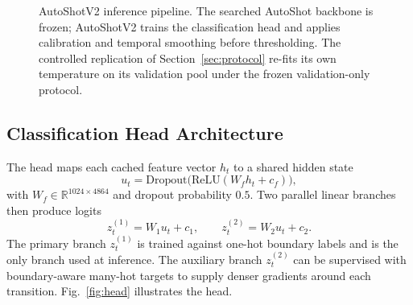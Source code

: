 \begin{figure}[!t]
\centering
{}
\caption{AutoShotV2 inference pipeline. The searched AutoShot backbone is
frozen; AutoShotV2 trains the classification head and applies calibration
and temporal smoothing before thresholding. The controlled replication of
Section~\ref{sec:protocol} re-fits its own temperature on its validation
pool under the frozen validation-only protocol.}
\label{fig:pipeline}
\end{figure}

\subsection{Classification Head Architecture}
\label{sec:head}

The head maps each cached feature vector $h_t$ to a shared hidden state
\begin{equation}
    u_t = \mathrm{Dropout}\bigl(\mathrm{ReLU}(W_f h_t + c_f)\bigr),
    \label{eq:hidden}
\end{equation}
with $W_f\in\mathbb{R}^{1024\times4864}$ and dropout probability $0.5$. Two
parallel linear branches then produce logits
\begin{equation}
    z^{(1)}_t = W_1 u_t + c_1, \qquad z^{(2)}_t = W_2 u_t + c_2.
    \label{eq:branches}
\end{equation}
The primary branch $z^{(1)}_t$ is trained against one-hot boundary labels
and is the only branch used at inference. The auxiliary branch
$z^{(2)}_t$ can be supervised with boundary-aware many-hot targets to supply
denser gradients around each transition. Fig.~\ref{fig:head} illustrates
the head.


